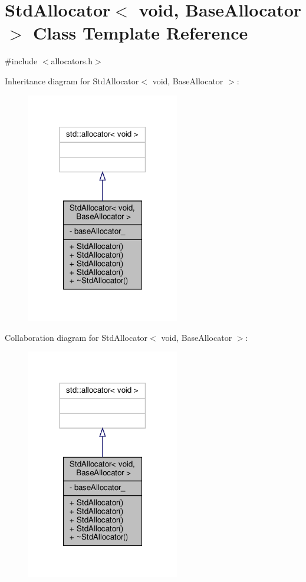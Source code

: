 \hypertarget{classStdAllocator_3_01void_00_01BaseAllocator_01_4}{}\section{Std\+Allocator$<$ void, Base\+Allocator $>$ Class Template Reference}
\label{classStdAllocator_3_01void_00_01BaseAllocator_01_4}


{\ttfamily \#include $<$allocators.\+h$>$}



Inheritance diagram for Std\+Allocator$<$ void, Base\+Allocator $>$\+:
\nopagebreak
\begin{figure}[H]
\begin{center}
\leavevmode
\includegraphics[width=189pt]{classStdAllocator_3_01void_00_01BaseAllocator_01_4__inherit__graph}
\end{center}
\end{figure}


Collaboration diagram for Std\+Allocator$<$ void, Base\+Allocator $>$\+:
\nopagebreak
\begin{figure}[H]
\begin{center}
\leavevmode
\includegraphics[width=189pt]{classStdAllocator_3_01void_00_01BaseAllocator_01_4__coll__graph}
\end{center}
\end{figure}
